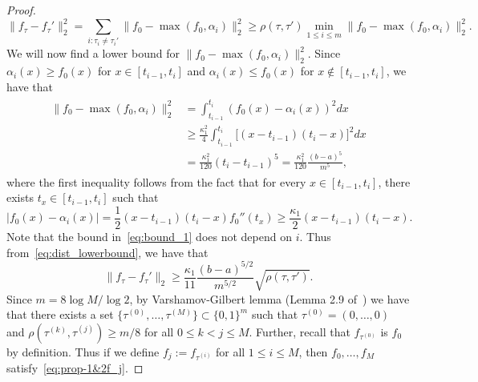 \begin{proof}
\begin{equation}
\|f_\tau-f_\tau'\|^2_2 = \sum_{i:\tau_i\neq\tau_i'} \|f_0-\max(f_0, \alpha_i)\|^2_2 \ge \rho(\tau, \tau') \min_{1\le i \le m} \|f_0-\max(f_0, \alpha_i)\|^2_2. 
\end{equation}
We will now find a lower bound for $\|f_0-\max(f_0, \alpha_i)\|^2_2$.  Since $\alpha_i(x) \ge f_0(x)$ for $x\in [t_{i-1}, t_i]$ and  $\alpha_i(x) \le f_0(x)$ for $x\notin [t_{i-1}, t_i]$, we have that
\begin{align}\label{eq:bound_1}
\begin{split}
\|f_0-\max(f_0, \alpha_i)\|^2_2&=  \int_{t_{i-1}}^{t_i}(f_0(x)-\alpha_i(x))^2 dx\\
&\ge\frac{\kappa_1^2}{4}\int_{t_{i-1}}^{t_i}\big[(x-t_{i-1})(t_i- x) \big]^2dx\\
&=\frac{\kappa_1^2}{120} (t_i-t_{i-1})^5= \frac{\kappa_1^2}{120} \frac{(b-a)^5}{m^5},
\end{split}
\end{align}
where the first inequality follows from the fact that for every $x \in [t_{i-1},t_i]$, there exists $t_x\in [t_{i-1},t_i]$ such that 
\[ |f_0(x)- \alpha_i(x)| = \frac{1}{2} (x-t_{i-1}) (t_i-x) f_0''(t_x) \ge \frac{\kappa_1}{2} (x-t_{i-1}) (t_i-x).\]
Note that the bound in~\eqref{eq:bound_1} does not depend on $i$. Thus from~\eqref{eq:dist_lowerbound}, we have that 
\begin{equation}\label{eq:lowerbounddiff}
\|f_\tau-f_\tau'\|_2  \ge \frac{\kappa_1}{11} \frac{(b-a)^{5/2}}{m^{5/2}}\sqrt{\rho(\tau, \tau')}.
\end{equation}
Since $m = 8 \log M/ \log 2$, by Varshamov-Gilbert lemma (Lemma 2.9 of~\citet[Page 104]{MR2724359}) we have that there exists a set $\{\tau^{(0)}, \ldots,\tau^{(M)}\}\subset \{0,1\}^m$ such that $\tau^{(0)} =(0, \ldots, 0)$ and  $\rho(\tau^{(k)}, \tau^{(j)}) \ge m/8$ for all $0\le k< j\le M.$ Further, recall that $f_{\tau^{(0)}}$ is $f_0$ by definition.  Thus if  we define $f_j := f_{\tau^{(i)}}$  for all $1\le i \le M$, then $f_0,\ldots,f_M$ satisfy~\eqref{eq:prop-1&2f_j}. 


\end{proof}
